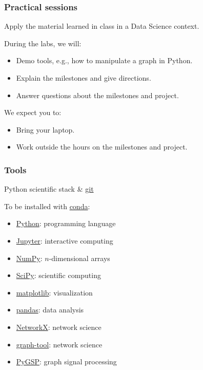 \documentclass[aspectratio=169]{beamer}
\begin{document}

\begin{frame}
	\frametitle{Practical sessions}
	\begin{center}
		Apply the material learned in class in a Data Science context.
	\end{center}
	\vfill
	During the labs, we will:
	\begin{itemize}
		\item Demo tools, e.g., how to manipulate a graph in Python.
		\item Explain the milestones and give directions.
		\item Answer questions about the milestones and project.
	\end{itemize}
	\vfill
	We expect you to:
	\begin{itemize}
		\item Bring your laptop.
		\item Work outside the hours on the milestones and project.
	\end{itemize}
\end{frame}


\begin{frame}
	\frametitle{Tools}
	\begin{center}
		Python scientific stack \& \href{https://git-scm.com}{git}
	\end{center}
	\vfill
	To be installed with \href{https://conda.io}{conda}:
	\begin{itemize}
		\item \href{https://www.python.org}{Python}: programming language
		\item \href{https://jupyter.org}{Jupyter}: interactive computing
		\item \href{http://www.numpy.org}{NumPy}: $n$-dimensional arrays
		\item \href{https://www.scipy.org/scipylib}{SciPy}: scientific computing
		\item \href{https://matplotlib.org}{matplotlib}: visualization
		\item \href{https://pandas.pydata.org}{pandas}: data analysis
		\item \href{https://networkx.github.io}{NetworkX}: network science
		\item \href{https://graph-tool.skewed.de}{graph-tool}: network science
		\item \href{https://github.com/epfl-lts2/pygsp}{PyGSP}: graph signal processing
	\end{itemize}
\end{frame}
\end{document}
